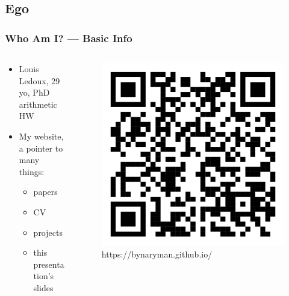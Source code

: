 \graphicspath{{./figs/}}
\subsection{Ego}

\begin{frame}
	\frametitle{Who Am I? — Basic Info}
	\begin{columns}
	\begin{column}{0.65\textwidth}
		\begin{itemize}
			\item Louis Ledoux, 29 yo, PhD arithmetic HW
			\item My website, a pointer to many things:
			\begin{itemize}
				\item papers
				\item CV
				\item projects
				\item this presentation's slides
			\end{itemize}
		\end{itemize}
	\end{column}
	\begin{column}{0.35\textwidth}
		\begin{figure}[H]
			\centering
			\includegraphics[width=\textwidth]{QR-Mysite.png}
			\caption{https://bynaryman.github.io/}
			\label{fig:qr_website}
		\end{figure}
	\end{column}
	\end{columns}
\end{frame}

